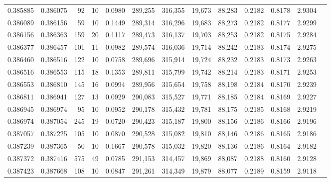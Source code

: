 \begin{tabular}{rrrrrrrrrrrrr}
0.385885 & 0.386075 &    92 &  10 &                                     0.0980 & 289,255 & 316,355 &  19,673 &  88,283 & 0.2182 & 0.8178 & 2.9304 \\
0.386089 & 0.386156 &    59 &  10 &                                     0.1449 & 289,314 & 316,296 &  19,683 &  88,273 & 0.2182 & 0.8177 & 2.9299 \\
0.386156 & 0.386363 &   159 &  20 &                                     0.1117 & 289,473 & 316,137 &  19,703 &  88,253 & 0.2182 & 0.8175 & 2.9284 \\
0.386377 & 0.386457 &   101 &  11 &                                     0.0982 & 289,574 & 316,036 &  19,714 &  88,242 & 0.2183 & 0.8174 & 2.9275 \\
0.386460 & 0.386516 &   122 &  10 &                                     0.0758 & 289,696 & 315,914 &  19,724 &  88,232 & 0.2183 & 0.8173 & 2.9263 \\
0.386516 & 0.386553 &   115 &  18 &                                     0.1353 & 289,811 & 315,799 &  19,742 &  88,214 & 0.2183 & 0.8171 & 2.9253 \\
0.386553 & 0.386810 &   145 &  16 &                                     0.0994 & 289,956 & 315,654 &  19,758 &  88,198 & 0.2184 & 0.8170 & 2.9239 \\
0.386811 & 0.386941 &   127 &  13 &                                     0.0929 & 290,083 & 315,527 &  19,771 &  88,185 & 0.2184 & 0.8169 & 2.9227 \\
0.386945 & 0.386974 &    95 &  10 &                                     0.0952 & 290,178 & 315,432 &  19,781 &  88,175 & 0.2185 & 0.8168 & 2.9219 \\
0.386974 & 0.387054 &   245 &  19 &                                     0.0720 & 290,423 & 315,187 &  19,800 &  88,156 & 0.2186 & 0.8166 & 2.9196 \\
0.387057 & 0.387225 &   105 &  10 &                                     0.0870 & 290,528 & 315,082 &  19,810 &  88,146 & 0.2186 & 0.8165 & 2.9186 \\
0.387239 & 0.387365 &    50 &  10 &                                     0.1667 & 290,578 & 315,032 &  19,820 &  88,136 & 0.2186 & 0.8164 & 2.9182 \\
0.387372 & 0.387416 &   575 &  49 &                                     0.0785 & 291,153 & 314,457 &  19,869 &  88,087 & 0.2188 & 0.8160 & 2.9128 \\
0.387423 & 0.387668 &   108 &  10 &                                     0.0847 & 291,261 & 314,349 &  19,879 &  88,077 & 0.2189 & 0.8159 & 2.9118 \\

\end{tabular}
